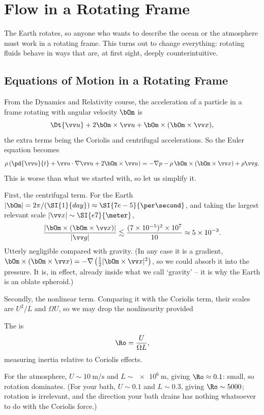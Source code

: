\section{Flow in a Rotating Frame}

The Earth rotates, so anyone who wants to describe the ocean or the atmosphere must work in a rotating frame. This turns out to change everything: rotating fluids behave in ways that are, at first sight, deeply counterintuitive.

\subsection{Equations of Motion in a Rotating Frame}

From the Dynamics and Relativity course, the acceleration of a particle in a frame rotating with angular velocity $\bOm$ is
$$
\Dt{\vv u} + 2\bOm\times\vv u + \bOm\times(\bOm\times\vv x),
$$
the extra terms being the Coriolis and centrifugal accelerations. So the Euler equation becomes
$$
\rho\left(\pd{\vv u}{t} + \vv u \cdot \nabla \vv u + 2\bOm\times\vv u\right) = -\nabla p - \rho\, \bOm\times(\bOm\times\vv x) + \rho\vv g.
$$
This is worse than what we started with, so let us simplify it.

First, the centrifugal term. For the Earth $|\bOm| = 2\pi/(\SI{1}{day}) \approx \SI{7e-5}{\per\second}$, and taking the largest relevant scale $|\vv x| \sim \SI{e7}{\meter}$,
$$
\frac{|\bOm\times(\bOm\times \vv x)|}{|\vv g|} \lesssim \frac{(7\times10^{-5})^2 \times 10^7}{10} \approx 5\times 10^{-3}.
$$
Utterly negligible compared with gravity. (In any case it is a gradient, $\bOm\times(\bOm\times\vv x) = -\nabla\left(\tfrac{1}{2}|\bOm\times\vv x|^2\right)$, so we could absorb it into the pressure. It is, in effect, already inside what we call `gravity' -- it is why the Earth is an oblate spheroid.)

Secondly, the nonlinear term. Comparing it with the Coriolis term, their scales are $U^2/L$ and $\Omega U$, so we may drop the nonlinearity provided

\begin{definition}
	The  is
	$$
	\Ro = \frac{U}{\Omega L},
	$$
	measuring inertia relative to Coriolis effects.
\end{definition}

For the atmosphere, $U \sim \SI{10}{\meter\per\second}$ and $L \sim \SI{e6}{\meter}$, giving $\Ro \approx 0.1$: small, so rotation dominates. (For your bath, $U \sim 0.1$ and $L \sim 0.3$, giving $\Ro \sim 5000$; rotation is irrelevant, and the direction your bath drains has nothing whatsoever to do with the Coriolis force.)

